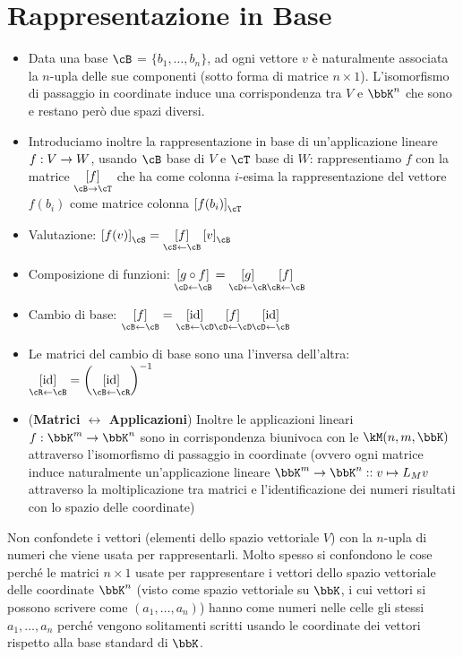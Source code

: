 \documentclass[a4paper,NoNotes,GeneralMath]{stdmdoc}
\newcommand{\mtrvec}[2]{\left[ {#1} \right]_{#2}}
\newcommand{\mtrapp}[3]{\underset{ {{#2} \rar {#3}} }{ \left[ {#1} \right]}}
\newcommand{\revmtrapp}[3]{\underset{ {{#3} \leftarrow {#2}} }{ \left[ {#1} \right]}}
\begin{document}
	\section*{Rappresentazione in Base}
	\begin{itemize}
		\item Data una base $\cB$ = $\{b_1, \ldots, b_n\}$, ad ogni vettore $v$ è naturalmente associata la $n$-upla delle sue componenti (sotto forma di matrice $n\times 1$). L'isomorfismo di passaggio in coordinate induce una corrispondenza tra $V$ e $\bbK^n$ che sono e restano però due spazi diversi. \\ \hsystem{\mtrvec{v}{\cB}: V \rar \kM(n, 1, \bbK)}{v = \sum_{i} a_i b_i \quad \mapsto \quad \left( \begin{array}{c} a_1 \\ \vdots \\ a_n \end{array} \right)_{\cB}}
		\item Introduciamo inoltre la rappresentazione in base di un'applicazione lineare $f: V \rightarrow W$, usando $\cB$ base di $V$ e $\cT$ base di $W$: rappresentiamo $f$ con la matrice $\mtrapp{f}{\cB}{\cT}$ che ha come colonna $i$-esima la rappresentazione del vettore $f(b_i)$ come matrice colonna $\mtrvec{f(b_i)}{\cT}$
		\item Valutazione: $\mtrvec{f(v)}{\cS} = \revmtrapp{f}{\cB}{\cS} \mtrvec{v}{\cB}$
		\item Composizione di funzioni: $\revmtrapp{g\circ f}{\cB}{\cD} = \revmtrapp{g}{\cR}{\cD} \revmtrapp{f}{\cB}{\cR}$
		\item Cambio di base: $\revmtrapp{f}{\cB}{\cB} = \revmtrapp{\Id}{\cD}{\cB} \revmtrapp{f}{\cD}{\cD} \revmtrapp{\Id}{\cB}{\cD}$
		\item Le matrici del cambio di base sono una l'inversa dell'altra: $\revmtrapp{\Id}{\cB}{\cR} = \left(\revmtrapp{\Id}{\cR}{\cB}\right) ^ {-1}$
		\item ({\bf Matrici $\leftrightarrow$ Applicazioni}) Inoltre le applicazioni lineari $f: \bbK^m \rar \bbK^n$ sono in corrispondenza biunivoca con le $\kM(n, m, \bbK)$ attraverso l'isomorfismo di passaggio in coordinate (ovvero ogni matrice induce naturalmente un'applicazione lineare $\bbK^m \rar \bbK^n :: v \mapsto L_M v$ attraverso la moltiplicazione tra matrici e l'identificazione dei numeri risultati con lo spazio delle coordinate)
	\end{itemize}
	\Achtung Non confondete i vettori (elementi dello spazio vettoriale $V$) con la $n$-upla di numeri che viene usata per rappresentarli. Molto spesso si confondono le cose perché le matrici $n\times 1$ usate per rappresentare i vettori dello spazio vettoriale delle coordinate $\bbK^n$ (visto come spazio vettoriale su $\bbK$, i cui vettori si possono scrivere come $(a_1, \ldots, a_n)$) hanno come numeri nelle celle gli stessi $a_1, \ldots, a_n$ perché vengono solitamenti scritti usando le coordinate dei vettori rispetto alla base standard di $\bbK$.
\end{document}
